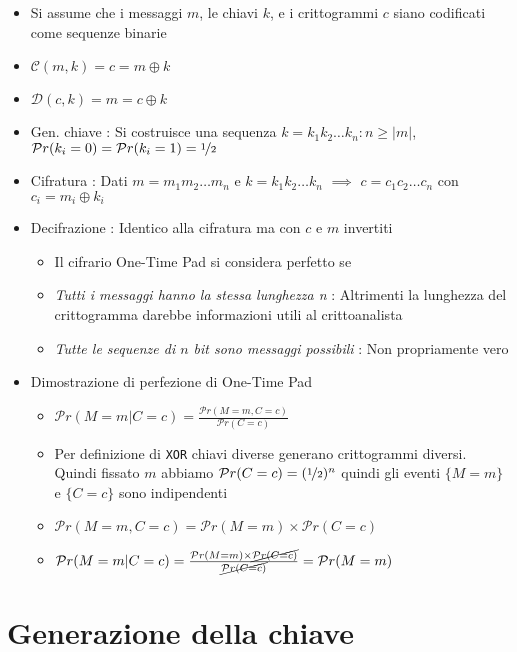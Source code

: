 \begin{itemize}
    \item Si assume che i messaggi $m$, le chiavi $k$, e i crittogrammi $c$ siano codificati come sequenze binarie
    \item $\mathcal{C}(m, k) = c = m \oplus k$
    \item $\mathcal{D}(c, k) = m = c \oplus k$
    \item Gen. chiave : Si costruisce una sequenza $k = k_1k_2\dots k_n : n \geq |m|$, $\mathcal{P}r(k_i = 0) = \mathcal{P}r(k_i = 1) = \nicefrac{1}{2}$
    \item Cifratura : Dati $m = m_1m_2\dots m_n$ e $k = k_1k_2\dots k_n$ $\implies$ $c = c_1c_2\dots c_n$ con $c_i = m_i \oplus k_i$
    \item Decifrazione : Identico alla cifratura ma con $c$ e $m$ invertiti
    \begin{itemize}
        \item Il cifrario One-Time Pad si considera perfetto se
        \item \textit{Tutti i messaggi hanno la stessa lunghezza n} : Altrimenti la lunghezza del crittogramma darebbe informazioni utili al crittoanalista
        \item \textit{Tutte le sequenze di $n$ bit sono messaggi possibili} : Non propriamente vero
    \end{itemize}
    \item Dimostrazione di perfezione di One-Time Pad
    \begin{itemize}
        \item $\mathcal{P}r(M = m | C = c) = \frac{\mathcal{P}r(M = m, C = c)}{\mathcal{P}r(C = c)}$
        \item Per definizione di \texttt{XOR} chiavi diverse generano crittogrammi diversi. Quindi fissato $m$ abbiamo $\mathcal{P}r(C = c) = (\nicefrac{1}{2})^n$ quindi gli eventi $\{M = m\}$ e $\{C = c\}$ sono indipendenti
        \item $\mathcal{P}r(M = m, C = c) = \mathcal{P}r(M = m) \times \mathcal{P}r(C = c)$
        \item $\mathcal{P}r(M = m | C = c) = \frac{\mathcal{P}r(M = m) \times \cancel{\mathcal{P}r(C = c)}}{\cancel{\mathcal{P}r(C = c)}} = \mathcal{P}r(M = m)$
    \end{itemize}
\end{itemize}

\section{Generazione della chiave}

